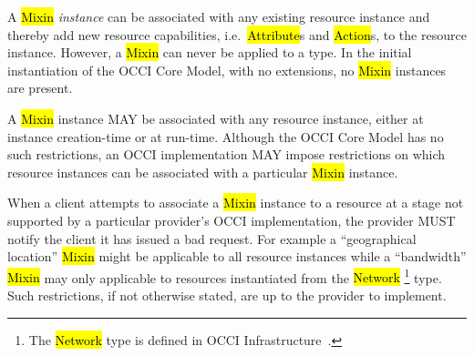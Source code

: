 \documentclass[10pt,a4paper]{article}
\begin{document}
A \hl{Mixin} {\em instance} can be associated with any existing
resource instance and thereby add new resource capabilities,
i.e.~\hl{Attribute}s and \hl{Action}s, to the resource instance. However, a
\hl{Mixin} can never be applied to a type.  In the initial
instantiation of the OCCI Core Model, with no extensions, no
\hl{Mixin} instances are present.

A \hl{Mixin} instance MAY be associated with any resource instance,
either at instance creation-time or at run-time. Although the OCCI
Core Model has no such restrictions, an OCCI implementation MAY impose
restrictions on which resource instances can be associated with a
particular \hl{Mixin} instance.

When a client attempts to associate a \hl{Mixin} instance to a
resource at a stage not supported by a particular provider's OCCI
implementation, the provider MUST notify the client it has issued a
bad request.
%
For example a ``geographical location'' \hl{Mixin} might be applicable
to all resource instances while a ``bandwidth'' \hl{Mixin} may only
applicable to resources instantiated from the \hl{Network}%
\footnote{The \hl{Network} type is defined in OCCI
  Infrastructure~\cite{occi:infrastructure}.}  type. Such
restrictions, if not otherwise stated, are up to the provider to
implement.

\end{document}
